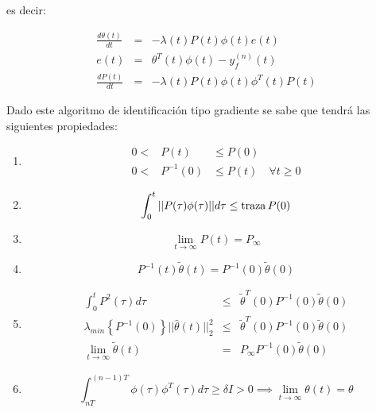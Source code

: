             es decir:

            \begin{eqnarray}
                \frac{d \theta(t)}{dt} & = & - \lambda(t) P(t) \phi(t) e(t) \nonumber \\
                e(t) & = & \theta^T(t) \phi(t) - y_f^{(n)}(t) \nonumber \\
                \frac{d P(t)}{dt} & = & - \lambda(t) P(t) \phi(t) \phi^T(t) P(t)
            \end{eqnarray}

            Dado este algoritmo de identificación tipo gradiente se sabe que tendrá las siguientes propiedades:

            \begin{enumerate}
                \item
                    \begin{eqnarray*}
                        0 < & P(t) & \le P(0) \\
                        0 < & P^{-1}(0) & \le P(t) \quad \forall t \ge 0
                    \end{eqnarray*}

                \item
                    \begin{equation*}
                        \int_0^t || P(\tau) \phi(\tau) || d\tau \le \operatorname{traza}{P(0)}
                    \end{equation*}

                \item
                    \begin{equation*}
                        \lim_{t \to \infty} P(t) = P_{\infty}
                    \end{equation*}

                \item
                    \begin{equation*}
                        P^{-1}(t)\tilde{\theta}(t) = P^{-1}(0) \tilde{\theta}(0)
                    \end{equation*}

                \item
                    \begin{eqnarray*}
                        \int_0^tP^2(\tau) d\tau & \le & \tilde{\theta}^T(0)P^{-1}(0)\tilde{\theta}(0) \\
                        \lambda_{min} \left\{ P^{-1}(0) \right\} || \hat{\theta}(t) ||_2^2 & \le & \tilde{\theta}^T(0)P^{-1}(0) \tilde{\theta}(0) \\
                        \lim_{t \to \infty} \tilde{\theta}(t) & = & P_{\infty}P^{-1}(0)\tilde{\theta}(0)
                    \end{eqnarray*}

                \item
                    \begin{equation*}
                        \int_{nT}^{(n-1)T} \phi(\tau) \phi^T(\tau) d\tau \ge \delta I > 0 \implies \lim_{t \to \infty} \theta(t) = \theta
                    \end{equation*}
            \end{enumerate}

